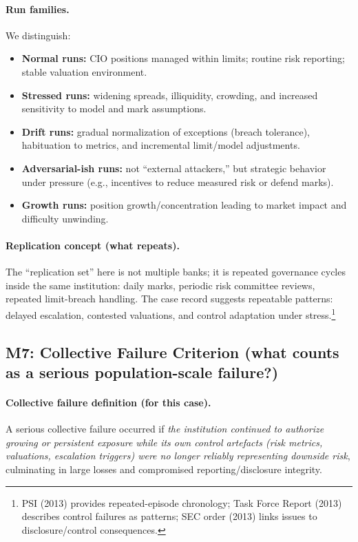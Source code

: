 \paragraph{Run families.}
We distinguish:
\begin{itemize}
\item \textbf{Normal runs:} CIO positions managed within limits; routine risk reporting; stable valuation environment.
\item \textbf{Stressed runs:} widening spreads, illiquidity, crowding, and increased sensitivity to model and mark assumptions.
\item \textbf{Drift runs:} gradual normalization of exceptions (breach tolerance), habituation to metrics, and incremental limit/model adjustments.
\item \textbf{Adversarial-ish runs:} not “external attackers,” but strategic behavior under pressure (e.g., incentives to reduce measured risk or defend marks).
\item \textbf{Growth runs:} position growth/concentration leading to market impact and difficulty unwinding.
\end{itemize}

\paragraph{Replication concept (what repeats).}
The “replication set” here is not multiple banks; it is repeated governance cycles inside the same institution: daily marks, periodic risk committee reviews, repeated limit-breach handling. The case record suggests repeatable patterns: delayed escalation, contested valuations, and control adaptation under stress.\footnote{PSI (2013) provides repeated-episode chronology; Task Force Report (2013) describes control failures as patterns; SEC order (2013) links issues to disclosure/control consequences.}

\subsection{M7: Collective Failure Criterion (what counts as a serious population-scale failure?)}
\label{subsec:lw-m7}

\paragraph{Collective failure definition (for this case).}
A serious collective failure occurred if \emph{the institution continued to authorize growing or persistent exposure while its own control artefacts (risk metrics, valuations, escalation triggers) were no longer reliably representing downside risk}, culminating in large losses and compromised reporting/disclosure integrity.

